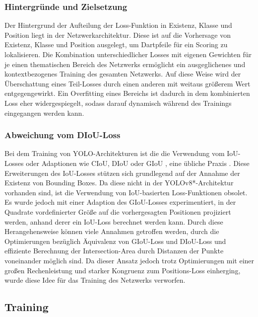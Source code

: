 \subsubsection{Hintergründe und Zielsetzung}

Der Hintergrund der Aufteilung der Loss-Funktion in Existenz, Klasse und Position liegt in der Netzwerkarchitektur. Diese ist auf die Vorhersage von Existenz, Klasse und Position ausgelegt, um Dartpfeile für ein Scoring zu lokalisieren. Die Kombination unterschiedlicher Losses mit eigenen Gewichten für je einen thematischen Bereich des Netzwerks ermöglicht ein ausgeglichenes und kontextbezogenes Training des gesamten Netzwerks. Auf diese Weise wird der Überschattung eines Teil-Losses durch einen anderen mit weitaus größerem Wert entgegengewirkt. Ein Overfitting eines Bereichs ist dadurch in dem kombinierten Loss eher widergespiegelt, sodass darauf dynamisch während des Trainings eingegangen werden kann.

\subsubsection{Abweichung vom DIoU-Loss}

Bei dem Training von YOLO-Architekturen ist die die Verwendung vom IoU-Losses oder Adaptionen wie CIoU, DIoU oder GIoU \cite{diou_losses}, eine übliche Praxis \cite{yolov1,yolov8_paper,yolo_training_giou}. Diese Erweiterungen des IoU-Losses stützen sich grundlegend auf der Annahme der Existenz von Bounding Boxes. Da diese nicht in der YOLOv8*-Architektur vorhanden sind, ist die Verwendung von IoU-basierten Loss-Funktionen obsolet. Es wurde jedoch mit einer Adaption des GIoU-Losses experimentiert, in der Quadrate vordefinierter Größe auf die vorhergesagten Positionen projiziert werden, anhand derer ein IoU-Loss berechnet werden kann. Durch diese Herangehensweise können viele Annahmen getroffen werden, durch die Optimierungen bezüglich Äquivalenz von GIoU-Loss und DIoU-Loss und effiziente Berechnung der Intersection-Area durch Distanzen der Punkte voneinander möglich sind. Da dieser Ansatz jedoch trotz Optimierungen mit einer großen Rechenleistung und starker Kongruenz zum Positions-Loss einherging, wurde diese Idee für das Training des Netzwerks verworfen.


\subsection{Training}
\label{sec:nn_training}

